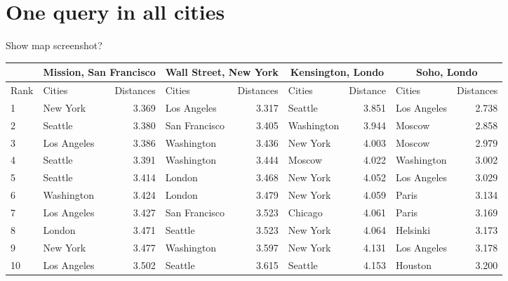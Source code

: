 \documentclass[svgnames,a4paper,final,notitlepage,10pt]{article}
\begin{document}
\section*{One query in all cities}
Show map screenshot?
\begin{center}
\begin{tabular}{llrlrlrlr}
\toprule
&\multicolumn{2}{c}{Mission, San Francisco} & \multicolumn{2}{c}{Wall Street, New York} & \multicolumn{2}{c}{Kensington, Londo}& \multicolumn{2}{c}{Soho, Londo} \\
\midrule
Rank & Cities &  Distances &            Cities &  Distances       & Cities   & Distance          & Cities &  Distances \\
\midrule
1 &     New York &        3.369 &    Los Angeles &         3.317 &          Seattle &             3.851 &                Los Angeles &         2.738 \\
2 &      Seattle &        3.380 &  San Francisco &         3.405 &          Washington &          3.944 &                     Moscow &         2.858 \\
3 &  Los Angeles &        3.386 &     Washington &         3.436 &          New York &            4.003 &                     Moscow &         2.979 \\
4 &      Seattle &        3.391 &     Washington &         3.444 &          Moscow &              4.022 &                 Washington &         3.002 \\
5 &      Seattle &        3.414 &         London &         3.468 &          New York &            4.052 &                Los Angeles &         3.029 \\
6 &   Washington &        3.424 &         London &         3.479 &          New York &            4.059 &                      Paris &         3.134 \\
7 &  Los Angeles &        3.427 &  San Francisco &         3.523 &          Chicago &             4.061 &                      Paris &         3.169 \\
8 &       London &        3.471 &        Seattle &         3.523 &          New York &            4.064 &                   Helsinki &         3.173 \\
9 &     New York &        3.477 &     Washington &         3.597 &          New York &            4.131 &                Los Angeles &         3.178 \\
10 &  Los Angeles &        3.502 &        Seattle &         3.615 &         Seattle &             4.153 &                     Houston &         3.200 \\

\end{tabular}
\end{center}
\end{document}
